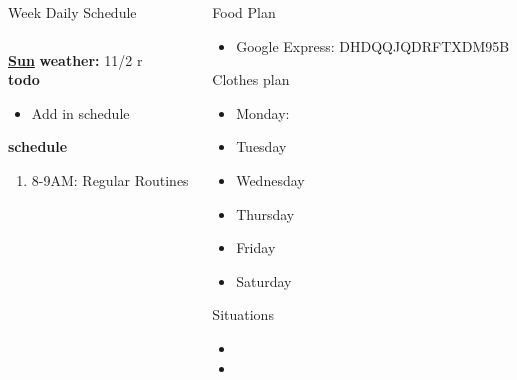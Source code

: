 \begin{columns}
\begin{column}{0.6\linewidth}
\begin{block}{Week Daily Schedule}
\begin{columns}
          \begin{column}{0.15\textwidth}{\small \underline{\bf Sun}}
            {\tiny {\bf weather:} } {\tiny 11/2 r} \\ 
            {\tiny {\bf todo}}\\
            \begin{itemize}
              \tiny \item \tiny Add in schedule
            \end{itemize} 
                {\tiny \bf schedule}\\
                \begin{enumerate} 
                  \tiny \item \tiny 8-9AM: Regular Routines 
                \end{enumerate}
          \end{column}
        \end{columns}
      \end{block}
\end{column}
    
    \begin{column}{0.20\linewidth}
      \begin{block}{Food Plan} 
        \begin{itemize}
          \tiny \item \tiny Google Express: DHDQQJQDRFTXDM95B
        \end{itemize}
      \end{block} 
      \begin{block}{Clothes plan} 
        \begin{itemize}
          \tiny \item \tiny Monday: 
        \item \tiny Tuesday
        \item \tiny Wednesday
        \item \tiny Thursday
        \item \tiny Friday
        \item \tiny Saturday
        \end{itemize} 
      \end{block} 
      
      \begin{block}{Situations}
        \begin{itemize}
          \tiny \item \tiny 
        \item \tiny 
        \end{itemize}
      \end{block}
    \end{column}
\end{columns}


